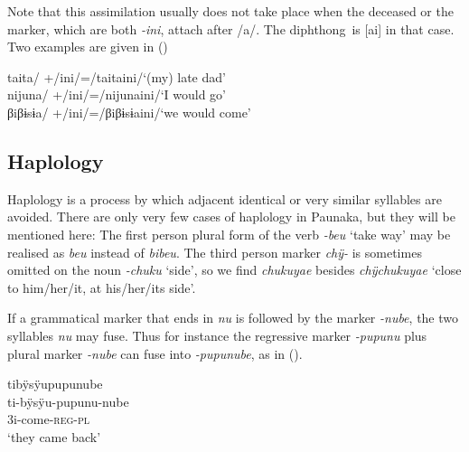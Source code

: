 Note that this assimilation usually does not take place when the deceased or the  marker, which are both \textit{-ini}, attach after /a/. The diphthong\ is [ai] in that case. Two examples are given in ()

\ea\label{ex:no-Vassi}
\ea 	\tab{/}taita/ \tab +\tab /ini/\tab =\tab /taitaini/\tab ‘(my) late dad’\\
\ex 	\tab{/}nijuna/ \tab +\tab /ini/\tab =\tab /nijunaini/\tab ‘I would go’\\
     \tab{/}βiβɨsɨa/ \tab +\tab /ini/\tab =\tab /βiβɨsɨaini/\tab ‘we would come’\\
\z
\xe
{}



\subsection{Haplology}\label{sec:Haplology}

Haplology is a process by which adjacent identical or very similar syllables are avoided. 
There are only very few cases of haplology in Paunaka, but they will be mentioned here: The first person plural form of the verb \textit{-beu} ‘take way’ may be realised as \textit{beu} instead of \textit{bibeu}. The third person marker \textit{chÿ-} is sometimes omitted on the noun \textit{-chuku} ‘side’, so we find \textit{chukuyae} besides \textit{chÿchukuyae} ‘close to him/her/it, at his/her/its side’. 

If a grammatical marker that ends in \textit{nu} is followed by the  marker \textit{-nube}, the two syllables \textit{nu} may fuse. Thus for instance the regressive marker \textit{-pupunu} plus plural marker \textit{-nube} can fuse into \textit{-pupunube}, as in ().

\ea\label{ex:haplology}
\begingl
\glpreamble tibÿsÿupupunube\\
\gla ti-bÿsÿu-pupunu-nube\\
\glb 3i-come-\textsc{reg}-\textsc{pl}\\
\glft ‘they came back’
\trailingcitation{[mqx-p110826l.084]}
\endgl
\xe

